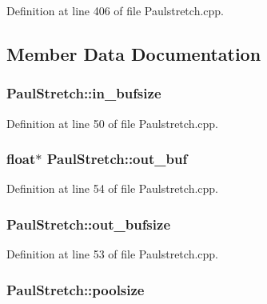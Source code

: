 Definition at line 406 of file Paulstretch.\+cpp.



\subsection{Member Data Documentation}
\subsubsection[{\texorpdfstring{in\+\_\+bufsize}{in_bufsize}}]{ Paul\+Stretch\+::in\+\_\+bufsize}\hypertarget{class_paul_stretch_a1764334c8682d1e033003632d1868b64}{}\label{class_paul_stretch_a1764334c8682d1e033003632d1868b64}


Definition at line 50 of file Paulstretch.\+cpp.

\subsubsection[{\texorpdfstring{out\+\_\+buf}{out_buf}}]{\setlength{\rightskip}{0pt plus 5cm}float$\ast$ Paul\+Stretch\+::out\+\_\+buf}\hypertarget{class_paul_stretch_a9a78c7f0ec886255b9b8c0eb3af0c22b}{}\label{class_paul_stretch_a9a78c7f0ec886255b9b8c0eb3af0c22b}


Definition at line 54 of file Paulstretch.\+cpp.

\subsubsection[{\texorpdfstring{out\+\_\+bufsize}{out_bufsize}}]{ Paul\+Stretch\+::out\+\_\+bufsize}\hypertarget{class_paul_stretch_a56bb169123574b057c55024f7aae5d90}{}\label{class_paul_stretch_a56bb169123574b057c55024f7aae5d90}


Definition at line 53 of file Paulstretch.\+cpp.

\subsubsection[{\texorpdfstring{poolsize}{poolsize}}]{ Paul\+Stretch\+::poolsize}\hypertarget{class_paul_stretch_ae18f59425914d1c4cf96ad9755e0d520}{}\label{class_paul_stretch_ae18f59425914d1c4cf96ad9755e0d520}


